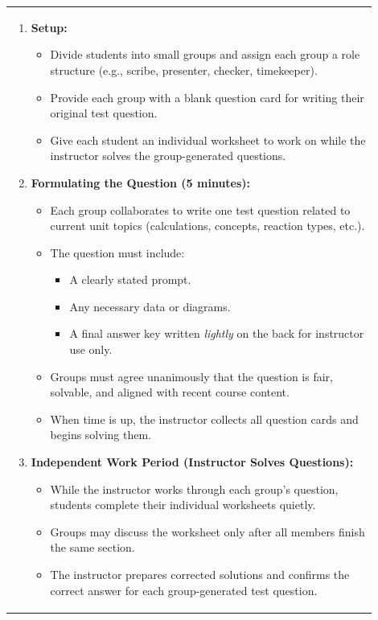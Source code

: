 \documentclass{article}
\begin{document}
\begin{tabular}{|p{0.9\linewidth}|}
\hline
\begin{enumerate}[label=\alph*.]
    \item \textbf{Setup:} 
    \begin{itemize}
        \item Divide students into small groups and assign each group a role structure (e.g., scribe, presenter, checker, timekeeper).
        \item Provide each group with a blank question card for writing their original test question.
        \item Give each student an individual worksheet to work on while the instructor solves the group-generated questions.
    \end{itemize}

    \item \textbf{Formulating the Question (5 minutes):}
    \begin{itemize}
        \item Each group collaborates to write one test question related to current unit topics (calculations, concepts, reaction types, etc.).
        \item The question must include:
            \begin{itemize}
                \item A clearly stated prompt.
                \item Any necessary data or diagrams.
                \item A final answer key written \emph{lightly} on the back for instructor use only.
            \end{itemize}
        \item Groups must agree unanimously that the question is fair, solvable, and aligned with recent course content.
        \item When time is up, the instructor collects all question cards and begins solving them.
    \end{itemize}

    \item \textbf{Independent Work Period (Instructor Solves Questions):}
    \begin{itemize}
        \item While the instructor works through each group’s question, students complete their individual worksheets quietly.
        \item Groups may discuss the worksheet only after all members finish the same section.
        \item The instructor prepares corrected solutions and confirms the correct answer for each group-generated test question.
    \end{itemize}
\end{enumerate}\\[0.2cm]
\end{tabular}
\end{document}

